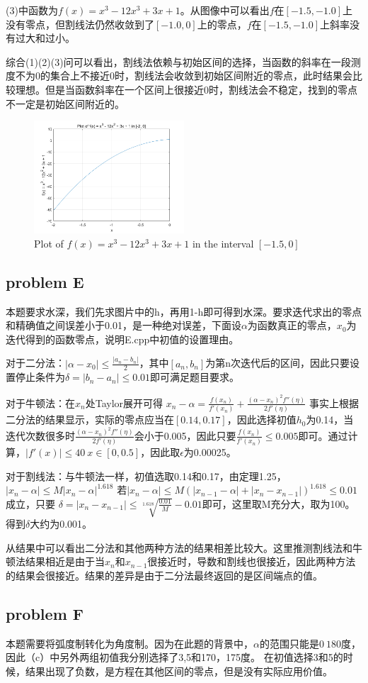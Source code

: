 \documentclass[a4paper]{article}
\begin{document}
(3)中函数为$f(x)=x^3-12x^3+3x+1$。从图像中可以看出$f$在$[-1.5,-1.0]$上没有零点，但割线法仍然收敛到了$[-1.0,0]$上的零点，$f$在$[-1.5,-1.0]$上斜率没有过大和过小。


综合(1)(2)(3)问可以看出，割线法依赖与初始区间的选择，当函数的斜率在一段测度不为0的集合上不接近0时，割线法会收敛到初始区间附近的零点，此时结果会比较理想。但是当函数斜率在一个区间上很接近0时，割线法会不稳定，找到的零点不一定是初始区间附近的。

\begin{figure}[H]  %
	\centering
	\includegraphics[width=0.5\textwidth]{f2.png}  %
	\caption{Plot of $f(x) =x^3-12x^3+3x+1$ in the interval $[-1.5, 0]$}
	\label{fig:function_plot}
\end{figure}

\subsection{problem E}
本题要求水深，我们先求图片中的h，再用1-h即可得到水深。要求迭代求出的零点和精确值之间误差小于0.01，是一种绝对误差，下面设$\alpha$为函数真正的零点，$x_0$为迭代得到的函数零点，说明E.cpp中初值的设置理由。

对于二分法：$|\alpha-x_0| \le \frac{|a_n-b_n|}{2}$，其中$[a_n,b_n]$为第n次迭代后的区间，因此只要设置停止条件为$\delta=|b_n-a_n| \le 0.01$即可满足题目要求。

对于牛顿法：在$x_n$处Taylor展开可得
$x_n-\alpha=\frac{f(x_n)}{{f}'(x_n)}+\frac{(\alpha-x_n)^2{f}''(\eta)}{2{f}'(\eta)}$
事实上根据二分法的结果显示，实际的零点应当在$[0.14,0.17]$，因此选择初值$h_0$为0.14，当迭代次数很多时$\frac{(\alpha-x_n)^2{f}''(\eta)}{2{f}'(\eta)}$会小于0.005，因此只要$\frac{f(x_n)}{{f}'(x_n)} \le 0.005$即可。通过计算，$|{f}'(x)| \le 40 \: x \in [0, 0.5]$，因此取$\epsilon$为0.00025。

对于割线法：与牛顿法一样，初值选取0.14和0.17，由定理1.25，$|x_n-\alpha| \le M|x_n-\alpha|^1.618$ 若$|x_n-\alpha| \le M(|x_{n-1}-\alpha|+|x_n-x_{n-1}|)^1.618 \le 0.01$成立，只要 $\delta=|x_n-x_{n-1}| \le \sqrt[1.618]{\frac{0.01}{M} } -0.01$即可，这里取M充分大，取为100。得到$\delta$大约为0.001。

从结果中可以看出二分法和其他两种方法的结果相差比较大。这里推测割线法和牛顿法结果相近是由于当$x_n$和$x_{n-1}$很接近时，导数和割线也很接近，因此两种方法的结果会很接近。结果的差异是由于二分法最终返回的是区间端点的值。
\subsection{problem F}
本题需要将弧度制转化为角度制。因为在此题的背景中，$\alpha$的范围只能是$0~180$度，因此（c）中另外两组初值我分别选择了3,5和170，175度。
在初值选择3和5的时候，结果出现了负数，是方程在其他区间的零点，但是没有实际应用价值。
\end{document}

